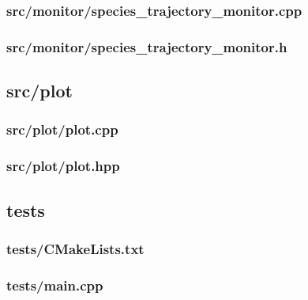 \subsubsection{src/monitor/species\_trajectory\_monitor.cpp}

\newpage
\subsubsection{src/monitor/species\_trajectory\_monitor.h}


\newpage
\subsection{src/plot}
\subsubsection{src/plot/plot.cpp}

\newpage
\subsubsection{src/plot/plot.hpp}


\newpage
\subsection{tests}
\subsubsection{tests/CMakeLists.txt}

\newpage
\subsubsection{tests/main.cpp}


